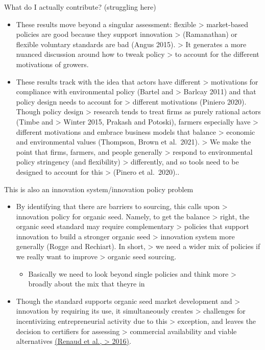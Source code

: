 \documentclass[twoside,12pt,final]{ucthesis-CA2012}
\providecommand{\tightlist}{%
  \setlength{\itemsep}{0pt}\setlength{\parskip}{0pt}}
\begin{document}
\begin{ucmainmatter}
What do I actually contribute? (struggling here)
\begin{itemize}
\item
  These results move beyond a singular assessment: flexible
  \textgreater{} market-based policies are good because they support innovation
  \textgreater{} (Ramanathan) or flexible voluntary standards are bad (Angus 2015).
  \textgreater{} It generates a more nuanced discussion around how to tweak policy
  \textgreater{} to account for the different motivations of growers.
\item
  These results track with the idea that actors have different
  \textgreater{} motivations for compliance with environmental policy (Bartel and
  \textgreater{} Barlcay 2011) and that policy design needs to account for
  \textgreater{} different motivations (Piniero 2020). Though policy design
  \textgreater{} research tends to treat firms as purely rational actors (Timbe and
  \textgreater{} Winter 2015, Prakash and Potoski), farmers especially have
  \textgreater{} different motivations and embrace business models that balance
  \textgreater{} economic and environmental values (Thompson, Brown et al.~2021).
  \textgreater{} We make the point that firms, farmers, and people generally
  \textgreater{} respond to environmental policy stringency (and flexibility)
  \textgreater{} differently, and so tools need to be designed to account for this
  \textgreater{} (Pinero et al.~2020)..
\end{itemize}
This is also an innovation system/innovation policy problem
\begin{itemize}
\item
  By identifying that there are barriers to sourcing, this calls upon
  \textgreater{} innovation policy for organic seed. Namely, to get the balance
  \textgreater{} right, the organic seed standard may require complementary
  \textgreater{} policies that support innovation to build a stronger organic seed
  \textgreater{} innovation system more generally (Rogge and Rechiart). In short,
  \textgreater{} we need a wider mix of policies if we really want to improve
  \textgreater{} organic seed sourcing.
  \begin{itemize}
  \tightlist
  \item
    Basically we need to look beyond single policies and think more
    \textgreater{} broadly about the mix that they\textquotesingle re in
  \end{itemize}
\item
  Though the standard supports organic seed market development and
  \textgreater{} innovation by requiring its use, it simultaneously creates
  \textgreater{} challenges for incentivizing entrepreneurial activity due to this
  \textgreater{} exception, and leaves the decision to certifiers for assessing
  \textgreater{} commercial availability and viable alternatives \href{https://www.zotero.org/google-docs/?broken=bElDy3}{(Renaud et al.,
  \textgreater{} 2016)}.
\end{itemize}
\hypertarget{reckoning-with-identities-of-environmental-movements}{%
}
\end{ucmainmatter}
\end{document}
